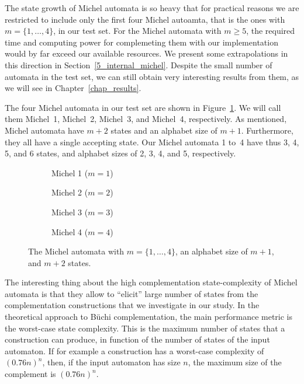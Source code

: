 The state growth of Michel automata is so heavy that for practical reasons we are restricted to include only the first four Michel autoamta, that is the ones with $m=\{1,\dots,4\}$, in our test set. For the Michel automata with $m \geq 5$, the required time and computing power for complemeting them with our implementation would by far exceed our available resources. We present some extrapolations in this direction in Section~\ref{5_internal_michel}. Despite the small number of automata in the test set, we can still obtain very interesting results from them, as we will see in Chapter~\ref{chap_results}.

The four Michel automata in our test set are shown in Figure~\ref{michel_automata}. We will call them Michel~1, Michel~2, Michel~3, and Michel~4, respectively. As mentioned, Michel automata have $m+2$ states and an alphabet size of $m+1$. Furthermore, they all have a single accepting state. Our Michel automata 1 to~4 have thus 3, 4, 5, and 6 states, and alphabet sizes of 2, 3, 4, and 5, respectively.

\newcommand{\subwidth}{0.42}
\begin{figure}[htb!]
\centering
  \begin{subfigure}[t]{\subwidth\textwidth}
  \MichelOne
  \caption{Michel 1 ($m=1$)}
  \end{subfigure}
  \begin{subfigure}[t]{\subwidth\textwidth}
  \MichelTwo
  \caption{Michel 2 ($m=2$)}
  \end{subfigure}

  \begin{subfigure}[b]{\subwidth\textwidth}
  \MichelThree
  \caption{Michel 3 ($m=3$)}
  \end{subfigure}
  \begin{subfigure}[b]{\subwidth\textwidth}
  \MichelFour
  \caption{Michel 4 ($m=4$)}
  \end{subfigure}
\caption{The Michel automata with $m = \{1,\dots,4\}$, an alphabet size of $m+1$, and $m+2$ states.}
\label{michel_automata}
\end{figure}

The interesting thing about the high complementation state-complexity of Michel automata is that they allow to ``elicit'' large number of states from the complementation constructions that we investigate in our study. In the theoretical approach to Büchi complementation, the main performance metric is the worst-case state complexity. This is the maximum number of states that a construction can produce, in function of the number of states of the input automaton. If for example a construction has a worst-case complexity of $(0.76n)^n$, then, if the input automaton has size $n$, the maximum size of the complement is $(0.76n)^n$.

